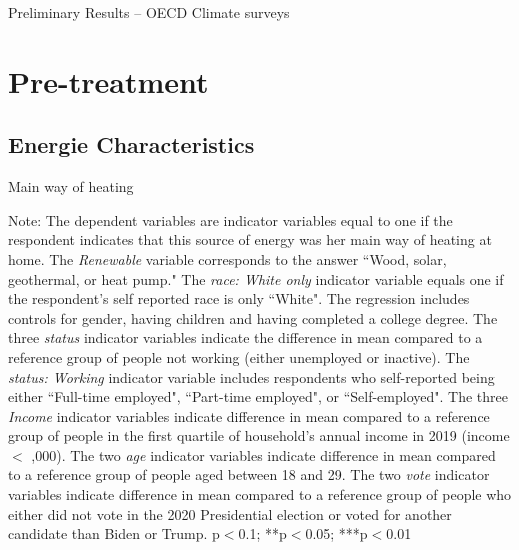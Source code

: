 \documentclass{article}
\begin{document}
\begin{LARGE}
	\begin{center}
		Preliminary Results – OECD Climate surveys	
	\end{center}
	
\end{LARGE}
	\tableofcontents
	\listoftables

\clearpage

\section{Pre-treatment}

\subsection{Energie Characteristics}

\begin{table}[h!]
	\caption{Main way of heating} \label{table heating}
	\begin{center}
		\scalebox{0.7}{}
	\end{center}
	{\footnotesize Note: The dependent variables are indicator variables equal to one if the respondent indicates that this source of energy was her main way of heating at home. The \textit{Renewable} variable corresponds to the answer ``Wood, solar, geothermal, or heat pump."
	The \textit{race: White only} indicator variable equals one if the respondent's self reported race is only ``White". The regression includes controls for gender, having children and having completed a college degree. The three \textit{status} indicator variables indicate the difference in mean compared to a reference group of people not working (either unemployed or inactive). The \textit{status: Working} indicator variable includes respondents who self-reported being either ``Full-time employed", ``Part-time employed", or ``Self-employed". The three \textit{Income} indicator variables indicate difference in mean compared to a reference group of people in the first quartile of household's annual income in 2019 (income $<$ ,000). The two \textit{age} indicator variables indicate difference in mean compared to a reference group of people aged between 18 and 29. The two \textit{vote} indicator variables indicate difference in mean compared to a reference group of people who either did not vote in the 2020 Presidential election or voted for another candidate than Biden or Trump.
	\newline  *p$<$0.1; **p$<$0.05; ***p$<$0.01}
\end{table}	
\end{document}
